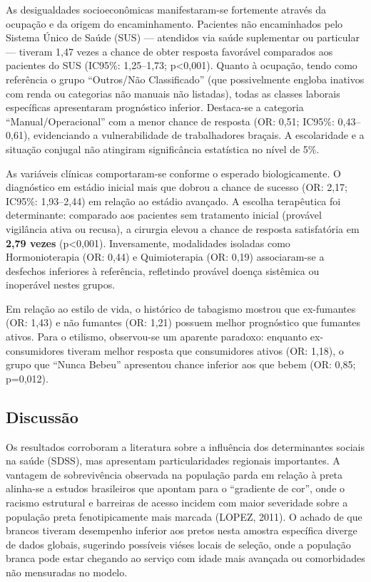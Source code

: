 \documentclass[
]{article}
\begin{document}
As desigualdades socioeconômicas manifestaram-se fortemente através da
ocupação e da origem do encaminhamento. Pacientes não encaminhados pelo
Sistema Único de Saúde (SUS) --- atendidos via saúde suplementar ou
particular --- tiveram 1,47 vezes a chance de obter resposta favorável
comparados aos pacientes do SUS (IC95\%: 1,25--1,73; p\textless0,001).
Quanto à ocupação, tendo como referência o grupo ``Outros/Não
Classificado'' (que possivelmente engloba inativos com renda ou
categorias não manuais não listadas), todas as classes laborais
específicas apresentaram prognóstico inferior. Destaca-se a categoria
``Manual/Operacional'' com a menor chance de resposta (OR: 0,51; IC95\%:
0,43--0,61), evidenciando a vulnerabilidade de trabalhadores braçais. A
escolaridade e a situação conjugal não atingiram significância
estatística no nível de 5\%.

As variáveis clínicas comportaram-se conforme o esperado biologicamente.
O diagnóstico em estádio inicial mais que dobrou a chance de sucesso
(OR: 2,17; IC95\%: 1,93--2,44) em relação ao estádio avançado. A escolha
terapêutica foi determinante: comparado aos pacientes sem tratamento
inicial (provável vigilância ativa ou recusa), a cirurgia elevou a
chance de resposta satisfatória em \textbf{2,79 vezes}
(p\textless0,001). Inversamente, modalidades isoladas como
Hormonioterapia (OR: 0,44) e Quimioterapia (OR: 0,19) associaram-se a
desfechos inferiores à referência, refletindo provável doença sistêmica
ou inoperável nestes grupos.

Em relação ao estilo de vida, o histórico de tabagismo mostrou que
ex-fumantes (OR: 1,43) e não fumantes (OR: 1,21) possuem melhor
prognóstico que fumantes ativos. Para o etilismo, observou-se um
aparente paradoxo: enquanto ex-consumidores tiveram melhor resposta que
consumidores ativos (OR: 1,18), o grupo que ``Nunca Bebeu'' apresentou
chance inferior aos que bebem (OR: 0,85; p=0,012).

\subsection{Discussão}\label{discussuxe3o}

Os resultados corroboram a literatura sobre a influência dos
determinantes sociais na saúde (SDSS), mas apresentam particularidades
regionais importantes. A vantagem de sobrevivência observada na
população parda em relação à preta alinha-se a estudos brasileiros que
apontam para o ``gradiente de cor'', onde o racismo estrutural e
barreiras de acesso incidem com maior severidade sobre a população preta
fenotipicamente mais marcada (LOPEZ, 2011). O achado de que brancos
tiveram desempenho inferior aos pretos nesta amostra específica diverge
de dados globais, sugerindo possíveis viéses locais de seleção, onde a
população branca pode estar chegando ao serviço com idade mais avançada
ou comorbidades não mensuradas no modelo.
\end{document}
